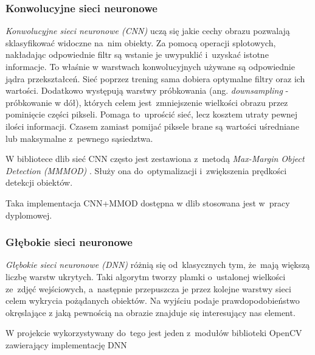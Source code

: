 \subsubsection{Konwolucyjne sieci neuronowe}

\textit{Konwolucyjne sieci neuronowe (CNN)} uczą się jakie cechy obrazu pozwalają sklasyfikować widoczne na~nim obiekty. Za pomocą operacji splotowych, nakładając odpowiednie filtr są wstanie je uwypuklić i~uzyskać istotne informacje. To właśnie w warstwach konwolucyjnych używane są odpowiednie jądra przekształceń. Sieć poprzez trening sama dobiera optymalne filtry oraz ich wartości. Dodatkowo występują warstwy próbkowania (ang. \textit{downsampling} - próbkowanie w dół), których celem jest~zmniejszenie wielkości obrazu przez pominięcie części pikseli. Pomaga to~uprościć sieć, lecz kosztem utraty pewnej ilości informacji. Czasem zamiast pomijać piksele brane są wartości uśredniane lub maksymalne z~pewnego sąsiedztwa. \cite{jak_cnn}

\vspace{5mm}

W bibliotece dlib sieć CNN często jest zestawiona z~metodą \textit{Max-Margin Object Detection (MMMOD)} \cite{mmod}. Służy ona do~optymalizacji i~zwiększenia prędkości detekcji obiektów.

\par

Taka implementacja CNN+MMOD dostępna w dlib stosowana jest w~pracy dyplomowej.



\subsubsection{Głębokie sieci neuronowe}


\textit{Głębokie sieci neuronowe (DNN)} różnią się od~klasycznych tym, że~mają większą liczbę warstw ukrytych. Taki algorytm tworzy plamki o~ustalonej wielkości ze~zdjęć wejściowych, a~następnie przepuszcza je przez kolejne warstwy sieci celem wykrycia pożądanych obiektów. Na wyjściu podaje prawdopodobieństwo okręslające z jaką pewnością na obrazie znajduje się interesujący nas element.

\par

W projekcie wykorzystywany do~tego jest jeden z~modułów biblioteki OpenCV zawierający implementację DNN \cite{opencv_dnn}

\par


